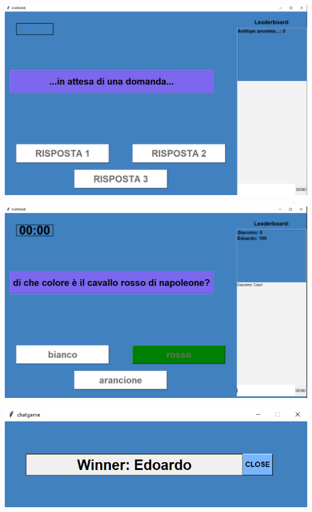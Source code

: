 \documentclass[a4paper,12pt]{report}
\begin{document}
\newpage

\includegraphics[width=\textwidth]{client_waitingGameStart.png}

\newpage

\includegraphics[width=\textwidth]{client.png}

\newpage

\includegraphics[width=\textwidth]{winner.png}

\newpage
\end{document}
